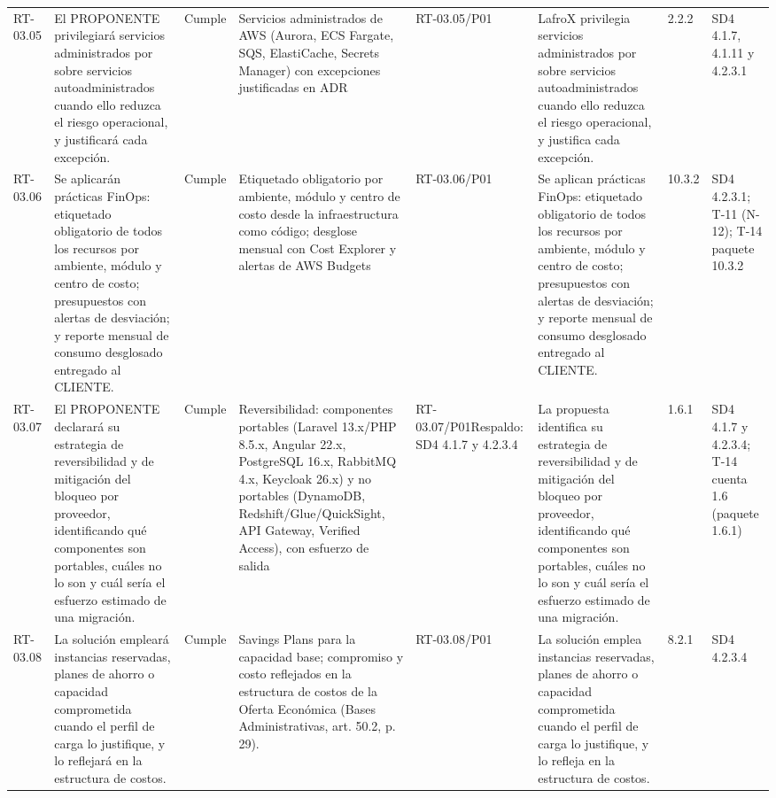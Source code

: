 \documentclass[oficio,firma,final]{lafrox}
\begin{document}
\begin{landscape}
{\begin{longtable}{@{}F{0.054} F{0.173} F{0.061} F{0.191} F{0.106} F{0.180} F{0.067} F{0.168}@{}}
  RT-03.05 & El PROPONENTE privilegiará servicios administrados por sobre servicios autoadministrados cuando ello reduzca el riesgo operacional, y justificará cada excepción. & Cumple & Servicios administrados de AWS (Aurora, ECS Fargate, SQS, ElastiCache, Secrets Manager) con excepciones justificadas en ADR & RT-03.05/\allowbreak{}P01 & LafroX privilegia servicios administrados por sobre servicios autoadministrados cuando ello reduzca el riesgo operacional, y justifica cada excepción. & 2.2.2 & SD4 4.1.7, 4.1.11 y 4.2.3.1  \\
  RT-03.06 & Se aplicarán prácticas FinOps: etiquetado obligatorio de todos los recursos por ambiente, módulo y centro de costo; presupuestos con alertas de desviación; y reporte mensual de consumo desglosado entregado al CLIENTE. & Cumple & Etiquetado obligatorio por ambiente, módulo y centro de costo desde la infraestructura como código; desglose mensual con Cost Explorer y alertas de AWS Budgets & RT-03.06/\allowbreak{}P01 & Se aplican prácticas FinOps: etiquetado obligatorio de todos los recursos por ambiente, módulo y centro de costo; presupuestos con alertas de desviación; y reporte mensual de consumo desglosado entregado al CLIENTE. & 10.3.2 & SD4 4.2.3.1; T-11 (N-12); T-14 paquete 10.3.2  \\
  RT-03.07 & El PROPONENTE declarará su estrategia de reversibilidad y de mitigación del bloqueo por proveedor, identificando qué componentes son portables, cuáles no lo son y cuál sería el esfuerzo estimado de una migración. & Cumple & Reversibilidad: componentes portables (Laravel 13.x/PHP 8.5.x, Angular 22.x, PostgreSQL 16.x, RabbitMQ 4.x, Keycloak 26.x) y no portables (DynamoDB, Redshift/Glue/QuickSight, API Gateway, Verified Access), con esfuerzo de salida & RT-03.07/\allowbreak{}P01\newline Respaldo: SD4 4.1.7 y 4.2.3.4 & La propuesta identifica su estrategia de reversibilidad y de mitigación del bloqueo por proveedor, identificando qué componentes son portables, cuáles no lo son y cuál sería el esfuerzo estimado de una migración. & 1.6.1 & SD4 4.1.7 y 4.2.3.4; T-14 cuenta 1.6 (paquete 1.6.1)  \\
  RT-03.08 & La solución empleará instancias reservadas, planes de ahorro o capacidad comprometida cuando el perfil de carga lo justifique, y lo reflejará en la estructura de costos. & Cumple & Savings Plans para la capacidad base; compromiso y costo reflejados en la estructura de costos de la Oferta Económica (Bases Administrativas, art. 50.2, p. 29). & RT-03.08/\allowbreak{}P01 & La solución emplea instancias reservadas, planes de ahorro o capacidad comprometida cuando el perfil de carga lo justifique, y lo refleja en la estructura de costos. & 8.2.1 & SD4 4.2.3.4  \\

\end{longtable}}
\end{landscape}
\end{document}
